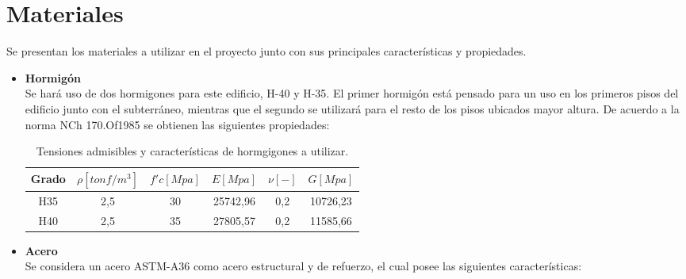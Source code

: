 \newpage
\section{Materiales}

Se presentan los materiales a utilizar en el proyecto junto con sus principales características y propiedades.

\begin{itemize}
    \item \textbf{Hormigón}\\
    Se hará uso de dos hormigones para este edificio, H-40 y H-35. El primer hormigón está pensado para un uso en los primeros pisos del edificio junto con el subterráneo, mientras que el segundo se utilizará para el resto de los pisos ubicados mayor altura. De acuerdo a la norma NCh 170.Of1985 se obtienen las siguientes propiedades:
    
    \begin{table}[H]
      \centering
      \caption{Tensiones admisibles y características de hormgigones a utilizar.}
        \begin{tabular}{|c|c|c|c|c|c|}
        \hline
        \textbf{Grado} &
          \boldmath{}\textbf{$\rho [tonf/m^3]$}\unboldmath{}&
          \boldmath{}\textbf{$f'c [Mpa]$} &
          \boldmath{}\textbf{$E [Mpa]$} &
          \boldmath{}\textbf{$\nu [-]$} &
          \boldmath{}\textbf{$G [Mpa]$}
          \boldmath{}\bigstrut\\
        \hline
        H35 &
          2,5 &
          30 &
          25742,96 &
          0,2 &
          10726,23
          \bigstrut[t]\\
        H40 &
          2,5 &
          35 &
          27805,57 &
          0,2 &
          11585,66
          \bigstrut[b]\\
        \hline
        \end{tabular}%
      \label{hormigon}%
    \end{table}%

    
    \item \textbf{Acero}\\
    Se considera un acero ASTM-A36 como acero estructural y de refuerzo, el cual posee las siguientes características:
    
    \begin{table}[H]
      \centering
      \caption{Tensiones admisibles y características del acero a utilizar.}
      \label{acero}%
    \end{table}%
    

\end{itemize}
